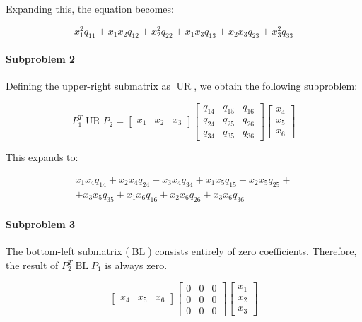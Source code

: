 Expanding this, the equation becomes:

\begin{equation}
 x_1^2q_{11} + x_1x_2q_{12} + x_2^2q_{22} + x_1x_3q_{13} + x_2x_3q_{23} + x_3^2q_{33}
    \label{eq:UL}
\end{equation}

\paragraph{Subproblem 2}
Defining the upper-right submatrix as $\operatorname{UR}$, we obtain the following subproblem:

\begin{equation*}
    P_1^T\operatorname{UR}P_2=
    \begin{bmatrix}
        x_1 & x_2 & x_3
    \end{bmatrix}
    \begin{bmatrix}
        q_{14} & q_{15} & q_{16} \\
        q_{24} & q_{25} & q_{26} \\
        q_{34} & q_{35} & q_{36}
    \end{bmatrix}
    \begin{bmatrix}
        x_4 \\
        x_5 \\
        x_6
    \end{bmatrix}
\end{equation*}

This expands to:

\begin{multline}
    x_1x_4q_{14} + x_2x_4q_{24} + x_3x_4q_{34} + x_1x_5q_{15} + x_2x_5q_{25} + \\ 
    + x_3x_5q_{35} + x_1x_6q_{16} + x_2x_6q_{26} + x_3x_6q_{36} 
    \label{eq:UR}
\end{multline}

\paragraph{Subproblem 3} The bottom-left submatrix ($\operatorname{BL}$) consists entirely of zero coefficients. 
Therefore, the result of $P_2^T\operatorname{BL}P_1$ is always zero.

\begin{equation*}
    \begin{bmatrix}
        x_4 & x_5 & x_6
    \end{bmatrix}
    \begin{bmatrix}
        0 & 0 & 0 \\
        0 & 0 & 0 \\
        0 & 0 & 0
    \end{bmatrix}
    \begin{bmatrix}
        x_1 \\
        x_2 \\
        x_3
    \end{bmatrix}
\end{equation*}

